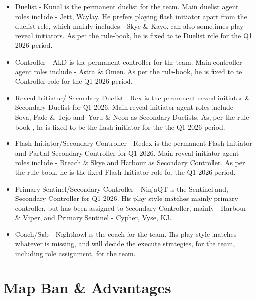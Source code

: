 \documentclass[letterpaper,11pt]{article}
\begin{document}
\begin{itemize}[left=0.15in, itemsep=-4pt]
	
\item Duelist - Kunal is the permanent duelist for the team. Main duelist agent roles include - Jett, Waylay. He prefers playing flash initiator apart from the duelist role, which mainly includes - Skye \& Kayo, can also sometimes play reveal initiators. As per the rule-book, he is fixed to te Duelist role for the Q1 2026 period. \newline

\item Controller - AkD is the permanent controller for the team. Main controller agent roles include - Astra \& Omen. As per the rule-book, he is fixed to te Controller role for the Q1 2026 period. \newline

\item Reveal Initiator/ Secondary Duelist - Rex is the permanent reveal initiator \& Secondary Duelist for Q1 2026. Main reveal initiator agent roles include - Sova, Fade \& Tejo and, Yoru \& Neon as Secondary Duelists. As, per the rule-book , he is fixed to be the flash initiator for the the Q1 2026 period. \newline

\item Flash Initiator/Secondary Controller -  Redex is the permanent Flash Initiator and Partial Secondary Controller for Q1 2026. Main reveal initiator agent roles include - Breach \& Skye and Harbour as Secondary Controller. As per the rule-book, he is the fixed Flash Initiator role for the Q1 2026 period. \newline

\item Primary Sentinel/Secondary Controller - NinjaQT is the Sentinel and, Secondary Controller for Q1 2026. His play style matches mainly primary controller, but has been assigned to Secondary Controller, mainly - Harbour \& Viper, and Primary Sentinel - Cypher, Vyse, KJ. \newline

\item Coach/Sub - Nighthowl is the coach for the team. His play style matches whatever is missing, and will decide the execute strategies, for the team, including role assignment, for the team.

\end{itemize}

\section{\textbf{Map Ban \& Advantages}}
\end{document}
